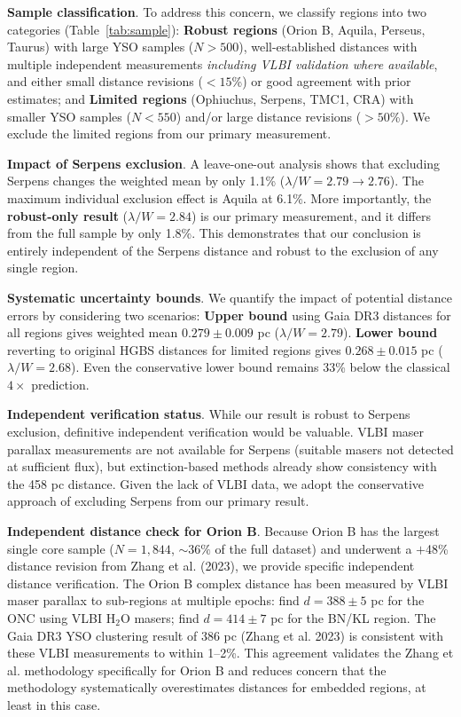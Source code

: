 \documentclass[twocolumn,usenatbib]{mnras}
\begin{document}
\textbf{Sample classification}. To address this concern, we classify regions into two categories (Table~\ref{tab:sample}): \textbf{Robust regions} (Orion B, Aquila, Perseus, Taurus) with large YSO samples ($N > 500$), well-established distances with multiple independent measurements \emph{including VLBI validation where available}, and either small distance revisions ($<15$\%) or good agreement with prior estimates; and \textbf{Limited regions} (Ophiuchus, Serpens, TMC1, CRA) with smaller YSO samples ($N < 550$) and/or large distance revisions ($>50$\%). We exclude the limited regions from our primary measurement.

\textbf{Impact of Serpens exclusion}. A leave-one-out analysis shows that excluding Serpens changes the weighted mean by only 1.1\% ($\lambda/W = 2.79 \to 2.76$). The maximum individual exclusion effect is Aquila at 6.1\%. More importantly, the \textbf{robust-only result} ($\lambda/W = 2.84$) is our primary measurement, and it differs from the full sample by only 1.8\%. This demonstrates that our conclusion is entirely independent of the Serpens distance and robust to the exclusion of any single region.

\textbf{Systematic uncertainty bounds}. We quantify the impact of potential distance errors by considering two scenarios: \textbf{Upper bound} using Gaia DR3 distances for all regions gives weighted mean $0.279 \pm 0.009$ pc ($\lambda/W = 2.79$). \textbf{Lower bound} reverting to original HGBS distances for limited regions gives $0.268 \pm 0.015$ pc ($\lambda/W = 2.68$). Even the conservative lower bound remains 33\% below the classical $4\times$ prediction.

\textbf{Independent verification status}. While our result is robust to Serpens exclusion, definitive independent verification would be valuable. VLBI maser parallax measurements are not available for Serpens (suitable masers not detected at sufficient flux), but extinction-based methods already show consistency with the 458 pc distance. Given the lack of VLBI data, we adopt the conservative approach of excluding Serpens from our primary result.

\textbf{Independent distance check for Orion B}. Because Orion B has the largest single core sample ($N = 1,844$, $\sim36\%$ of the full dataset) and underwent a $+$48\% distance revision from Zhang et al. (2023), we provide specific independent distance verification. The Orion B complex distance has been measured by VLBI maser parallax to sub-regions at multiple epochs: \citet{Kounkel2017} find $d = 388 \pm 5$ pc for the ONC using VLBI H$_2$O masers; \citet{Menten2007} find $d = 414 \pm 7$ pc for the BN/KL region. The Gaia DR3 YSO clustering result of 386 pc (Zhang et al. 2023) is consistent with these VLBI measurements to within 1--2\%. This agreement validates the Zhang et al. methodology specifically for Orion B and reduces concern that the methodology systematically overestimates distances for embedded regions, at least in this case.
\end{document}
